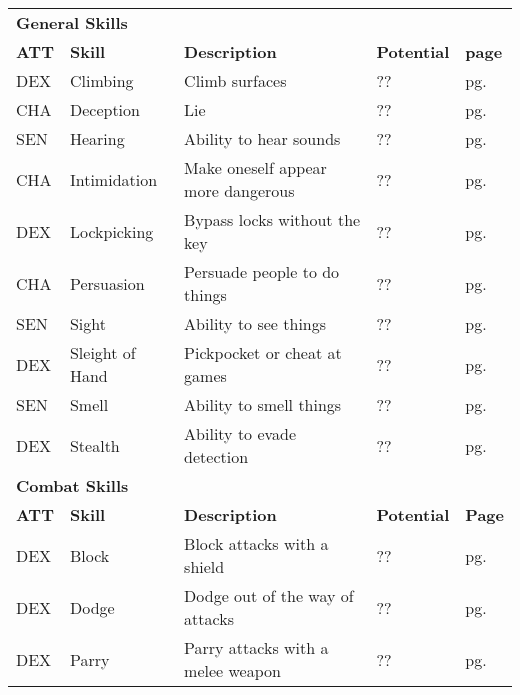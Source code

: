 


\begin{table}[h!]
    \begin{tabular}{l l l l l}
        \multicolumn{5}{l}{\bfseries{General Skills}} \\
        \bfseries{ATT} & \bfseries{Skill} & \bfseries{Description} & \bfseries{Potential} & \bfseries{page} \\
        DEX & Climbing & Climb surfaces & ?? & pg. \pageref{skill:climbing} \\
        CHA & Deception & Lie & ?? & pg. \pageref{skill:deception} \\
        SEN & Hearing & Ability to hear sounds & ?? & pg. \pageref{skill:hearing} \\
        CHA & Intimidation & Make oneself appear more dangerous & ?? & pg. \pageref{skill:intimidation} \\
        DEX & Lockpicking & Bypass locks without the key & ?? & pg. \pageref{skill:lockpicking} \\
        CHA & Persuasion & Persuade people to do things & ?? & pg. \pageref{skill:persuasion} \\
        SEN & Sight & Ability to see things & ?? & pg. \pageref{skill:sight} \\
        DEX & Sleight of Hand & Pickpocket or cheat at games & ?? & pg. \pageref{skill:sleight-of-hand} \\
        SEN & Smell & Ability to smell things & ?? & pg. \pageref{skill:smell} \\
        DEX & Stealth & Ability to evade detection & ?? & pg. \pageref{skill:stealth} \\
        \multicolumn{5}{l}{\bfseries{Combat Skills}} \\
        \bfseries{ATT} & \bfseries{Skill} & \bfseries{Description} & \bfseries{Potential} & \bfseries{Page} \\
        DEX & Block & Block attacks with a shield & ?? & pg. \pageref{skill:block} \\
        DEX & Dodge & Dodge out of the way of attacks & ?? & pg. \pageref{skill:dodge} \\
        DEX & Parry & Parry attacks with a melee weapon & ?? & pg. \pageref{skill:parry} \\

\end{tabular}
\end{table}
